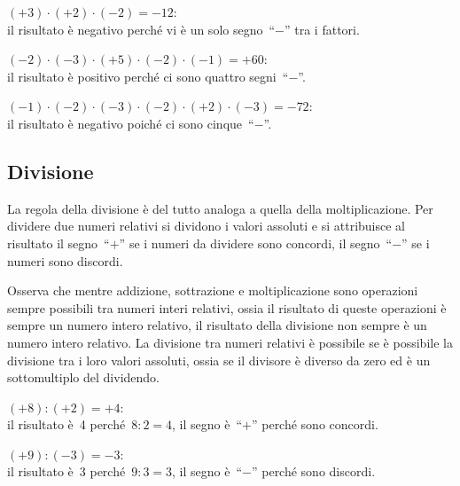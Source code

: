  \begin{esempio}
\((+3)\cdot (+2)\cdot (-2) =-12\): \\
il risultato è negativo perché vi è un solo segno~``\(-\)'' tra i fattori.
 \end{esempio}

 \begin{esempio}
\((-2)\cdot (-3)\cdot (+5)\cdot (-2)\cdot (-1) = +60\): \\ 
il risultato è positivo perché ci sono quattro segni~``\(-\)''.
 \end{esempio}

 \begin{esempio}
\((-1)\cdot (-2)\cdot (-3)\cdot (-2)\cdot (+2)\cdot (-3) = -72\): \\ 
il risultato è negativo poiché ci sono cinque~``\(-\)''.
 \end{esempio}


\subsection{Divisione}

La regola della divisione è del tutto analoga a quella della 
moltiplicazione.
Per dividere due numeri relativi si dividono i valori assoluti e si 
attribuisce
al risultato il segno~``\(+\)'' se i numeri da dividere sono concordi, il 
segno~``\(-\)'' se i numeri sono discordi.

Osserva che mentre addizione, sottrazione e moltiplicazione sono operazioni 
sempre possibili
tra numeri interi relativi, ossia il risultato di queste operazioni è 
sempre un 
numero intero
relativo, il risultato della divisione non sempre è un numero intero 
relativo. 
La divisione
tra numeri relativi è possibile se è possibile la divisione tra i loro 
valori 
assoluti, ossia se
il divisore è diverso da zero ed è un sottomultiplo del dividendo.
 \begin{esempio}
\((+8):(+2)=+4\): \\
il risultato è~4 perché~\(8:2=4\), il segno è~``\(+\)'' perché sono 
concordi.
 \end{esempio}

\begin{esempio}
\((+9):(-3)=-3\): \\ 
il risultato è~3 perché~\(9:3=3\), il segno è~``\(-\)'' perché sono 
discordi.
 \end{esempio}

